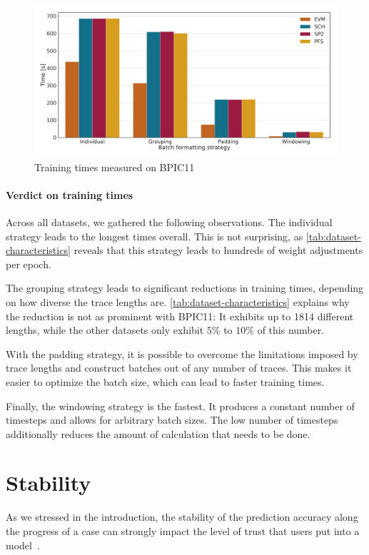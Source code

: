 \begin{figure}[!htb]
    \centering
    \includegraphics[width=\textwidth]{gfx/bpic2011/train_timings.pdf}
    \caption{Training times measured on BPIC11}
    \label{fig:BPIC11-training-timings}
\end{figure}

\paragraph{Verdict on training times}
Across all datasets, we gathered the following observations.
The individual strategy leads to the longest times overall.
This is not surprising, as \autoref{tab:dataset-characteristics} reveals that this strategy leads to hundreds of weight adjustments per epoch.

The grouping strategy leads to significant reductions in training times, depending on how diverse the trace lengths are. \autoref{tab:dataset-characteristics} explains why the reduction is not as prominent with BPIC11: It exhibits up to 1814 different lengths, while the other datasets only exhibit $5\%$ to $10\%$ of this number.

With the padding strategy, it is possible to overcome the limitations imposed by trace lengths and construct batches out of any number of traces. This makes it easier to optimize the batch size, which can lead to faster training times.

Finally, the windowing strategy is the fastest.
It produces a constant number of timesteps and allows for arbitrary batch sizes.
The low number of timesteps additionally reduces the amount of calculation that needs to be done.
\FloatBarrier

\section{Stability}\label{sec:eval:stability}
As we stressed in the introduction, the stability of the prediction accuracy along the progress of a case can strongly impact the level of trust that users put into a model~\cite{metzger2015}.

